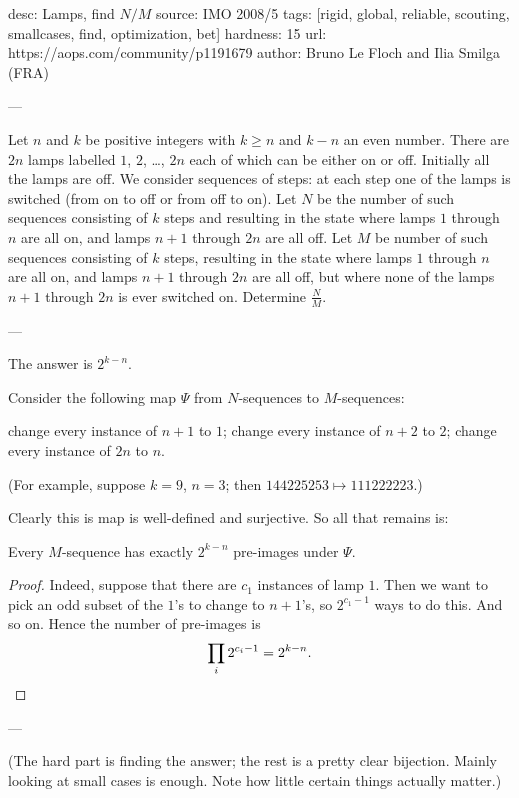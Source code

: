 desc:  Lamps, find $N / M$
source:  IMO 2008/5
tags:  [rigid, global, reliable, scouting, smallcases, find, optimization, bet]
hardness: 15
url: https://aops.com/community/p1191679
author: Bruno Le Floch and Ilia Smilga (FRA)

---

Let $n$ and $k$ be positive integers with $k \geq n$ and $k - n$ an even number.
There are $2n$ lamps labelled $1$, $2$, \dots, $2n$ each of which can be either on or off.
Initially all the lamps are off.
We consider sequences of steps: at each step one of the lamps is switched
(from on to off or from off to on).
Let $N$ be the number of such sequences consisting of $k$ steps
and resulting in the state where lamps $1$ through $n$ are all on,
and lamps $n + 1$ through $2n$ are all off.
Let $M$ be number of such sequences consisting of $k$ steps,
resulting in the state where lamps $1$ through $n$ are all on,
and lamps $n + 1$ through $2n$ are all off,
but where none of the lamps $n + 1$ through $2n$ is ever switched on.
Determine $\frac{N}{M}$.

---

The answer is $2^{k-n}$.

Consider the following map $\Psi$ from $N$-sequences to $M$-sequences:
\begin{itemize}
  \ii change every instance of $n+1$ to $1$;
  \ii change every instance of $n+2$ to $2$;
  \ii[$\vdots$]
  \ii change every instance of $2n$ to $n$.
\end{itemize}
(For example, suppose $k=9$, $n=3$;
then $144225253 \mapsto 111222223$.)

Clearly this is map is well-defined and surjective.
So all that remains is:
\begin{claim*}
  Every $M$-sequence has exactly $2^{k-n}$ pre-images under $\Psi$.
\end{claim*}
\begin{proof}
  Indeed, suppose that there are $c_1$ instances of lamp $1$.
  Then we want to pick an odd subset of the $1$'s to change to $n+1$'s,
  so $2^{c_1 - 1}$ ways to do this.
  And so on.
  Hence the number of pre-images is
  \[ \prod_i 2^{c_i - 1} = 2^{k-n}. \qedhere \]
\end{proof}

---

(The hard part is finding the answer;
the rest is a pretty clear bijection.
Mainly looking at small cases is enough.
Note how little certain things actually matter.)
